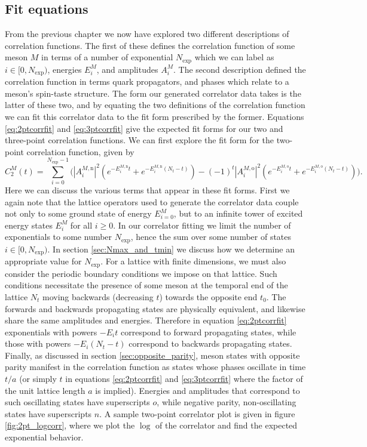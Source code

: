 \subsection{Fit equations}
From the previous chapter we now have explored two different descriptions of correlation functions.  The first of these defines the correlation function of some meson $M$ in terms of a number of exponential $N_\mathrm{exp}$ which we can label as $i \in [0,N_\mathrm{exp})$, energies $E_i^M$, and amplitudes $A^M_i$.  The second description defined the correlation function in terms quark propagators, and phases which relate to a meson's spin-taste structure.  The form our generated correlator data takes is the latter of these two, and by equating the two definitions of the correlation function we can fit this correlator data to the fit form prescribed by the former.
Equations \ref{eq:2ptcorrfit} and \ref{eq:3ptcorrfit} give the expected fit forms for our two and three-point correlation functions.  We can first explore the fit form for the two-point correlation function, given by
\begin{equation}\label{eq:2ptcorrfit}
    C_2^M(t)=\sum^{N_\mathrm{exp}-1}_{i=0}\big(|A_i^{M,\mathrm{n}}|^2(e^{-E_i^{M,\mathrm{n}}t}+e^{-E_i^{M,\mathrm{n}}(N_t-t)}) -(-1)^{t}|A_i^{M,\mathrm{o}}|^2(e^{-E_i^{M,\mathrm{o}}t}+e^{-E_i^{M,\mathrm{o}}(N_t-t)})\big).
\end{equation}
Here we can discuss the various terms that appear in these fit forms.  First we again note that the lattice operators used to generate the correlator data couple not only to some ground state of energy $E^M_{i=0}$, but to an infinite tower of excited energy states $E_i^M$ for all $i\geq0$.  In our correlator fitting we limit the number of exponentials to some number $N_\mathrm{exp}$, hence the sum over some number of states $i \in [0,N_\mathrm{exp})$.  In section \ref{sec:Nmax_and_tmin} we discuss how we determine an appropriate value for $N_\mathrm{exp}$.  For a lattice with finite dimensions, we must also consider the periodic boundary conditions we impose on that lattice.  Such conditions necessitate the presence of some meson at the temporal end of the lattice $N_t$ moving backwards (decreasing $t$) towards the opposite end $t_0$. The forwards and backwards propagating states are physically equivalent, and likewise share the same amplitudes and energies.  Therefore in equation \ref{eq:2ptcorrfit} exponentials with powers $-E_it$ correspond to forward propagating states, while those with powers $-E_i(N_t-t)$ correspond to backwards propagating states.  Finally, as discussed in section \ref{sec:opposite_parity}, meson states with opposite parity manifest in the correlation function as states whose phases oscillate in time $t/a$ (or simply $t$ in equations \ref{eq:2ptcorrfit} and \ref{eq:3ptcorrfit} where the factor of the unit lattice length $a$ is implied).  Energies and amplitudes that correspond to such oscillating states have superscripts $o$, while negative parity, non-oscillating states have superscripts $n$.  A sample two-point correlator plot is given in figure \ref{fig:2pt_logcorr}, where we plot the $\log$ of the correlator and find the expected exponential behavior. 
